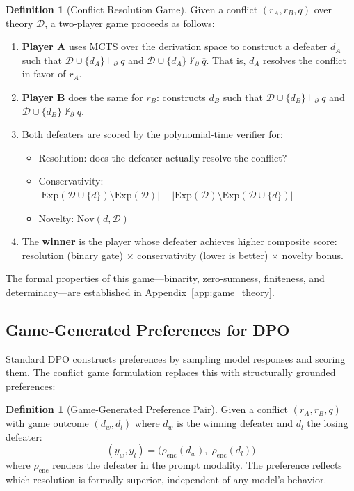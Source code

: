 \documentclass{article}
\theoremstyle{definition}
\newtheorem{definition}[theorem]{Definition}
\newcommand{\D}{\mathcal{D}}
\newcommand{\Exp}{\mathrm{Exp}}
\newcommand{\Nov}{\mathrm{Nov}}
\newcommand{\pPartial}{\vdash_{\partial}}
\newcommand{\comp}[1]{\overline{#1}}
\begin{document}
\begin{definition}[Conflict Resolution Game]\label{def:conflict_game}
Given a conflict $(r_A, r_B, q)$ over theory $\D$, a two-player game proceeds as follows:
\begin{enumerate}[nosep]
    \item \textbf{Player A} uses MCTS over the derivation space to construct a defeater $d_A$ such that $\D \cup \{d_A\} \pPartial q$ and $\D \cup \{d_A\} \not\pPartial \comp{q}$. That is, $d_A$ resolves the conflict in favor of $r_A$.
    \item \textbf{Player B} does the same for $r_B$: constructs $d_B$ such that $\D \cup \{d_B\} \pPartial \comp{q}$ and $\D \cup \{d_B\} \not\pPartial q$.
    \item Both defeaters are scored by the polynomial-time verifier for:
    \begin{itemize}[nosep]
        \item Resolution: does the defeater actually resolve the conflict?
        \item Conservativity: $|\Exp(\D \cup \{d\}) \setminus \Exp(\D)| + |\Exp(\D) \setminus \Exp(\D \cup \{d\})|$
        \item Novelty: $\Nov(d, \D)$
    \end{itemize}
    \item The \textbf{winner} is the player whose defeater achieves higher composite score: resolution (binary gate) $\times$ conservativity (lower is better) $\times$ novelty bonus.
\end{enumerate}
The formal properties of this game---binarity, zero-sumness, finiteness, and determinacy---are established in Appendix~\ref{app:game_theory}.
\end{definition}


\subsection{Game-Generated Preferences for DPO}\label{subsec:game_prefs}

Standard DPO constructs preferences by sampling model responses and scoring them. The conflict game formulation replaces this with structurally grounded preferences:

\begin{definition}[Game-Generated Preference Pair]\label{def:game_pref}
Given a conflict $(r_A, r_B, q)$ with game outcome $(d_w, d_l)$ where $d_w$ is the winning defeater and $d_l$ the losing defeater:
\[
    (y_w, y_l) = \bigl(\rho_{\mathrm{enc}}(d_w),\; \rho_{\mathrm{enc}}(d_l)\bigr)
\]
where $\rho_{\mathrm{enc}}$ renders the defeater in the prompt modality. The preference reflects which resolution is formally superior, independent of any model's behavior.
\end{definition}
\end{document}
